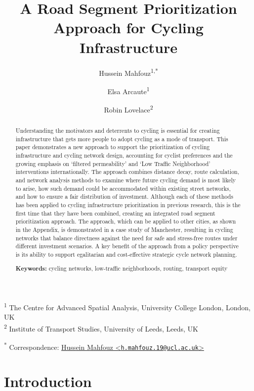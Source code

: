 \documentclass[
]{article}
\title{A Road Segment Prioritization Approach for Cycling Infrastructure}
\author{Hussein Mahfouz\textsuperscript{1,*} \and Elsa Arcaute\textsuperscript{1} \and Robin Lovelace\textsuperscript{2}}
\date{}
\begin{document}
\maketitle
\begin{abstract}
Understanding the motivators and deterrents to cycling is essential for creating infrastructure that gets more people to adopt cycling as a mode of transport. This paper demonstrates a new approach to support the prioritization of cycling infrastructure and cycling network design, accounting for cyclist preferences and the growing emphasis on `filtered permeability' and `Low Traffic Neighborhood' interventions internationally. The approach combines distance decay, route calculation, and network analysis methods to examine where future cycling demand is most likely to arise, how such demand could be accommodated within existing street networks, and how to ensure a fair distribution of investment. Although each of these methods has been applied to cycling infrastructure prioritization in previous research, this is the first time that they have been combined, creating an integrated road segment prioritization approach. The approach, which can be applied to other cities, as shown in the Appendix, is demonstrated in a case study of Manchester, resulting in cycling networks that balance directness against the need for safe and stress-free routes under different investment scenarios. A key benefit of the approach from a policy perspective is its ability to support egalitarian and cost-effective strategic cycle network planning.

\par

\textbf{Keywords:} cycling networks, low-traffic neighborhoods, routing, transport equity
\end{abstract}

\textsuperscript{1} The Centre for Advanced Spatial Analysis, University College London, London, UK\\
\textsuperscript{2} Institute of Transport Studies, University of Leeds, Leeds, UK

\textsuperscript{*} Correspondence: \href{mailto:h.mahfouz.19@ucl.ac.uk}{Hussein Mahfouz \textless{}\href{mailto:h.mahfouz.19@ucl.ac.uk}{\nolinkurl{h.mahfouz.19@ucl.ac.uk}}\textgreater{}}

\hypertarget{introduction}{%
\section{Introduction}\label{introduction}}
\end{document}
